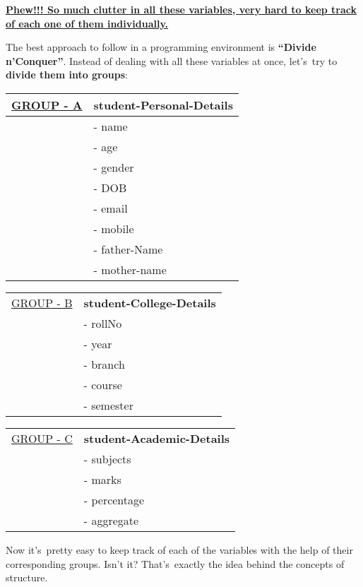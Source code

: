 \documentclass[11pt]{article}
\begin{document}
\uline{\textbf{Phew!!! So much clutter in all these variables, very hard to keep track of each
one of them individually.}}

The best approach to follow in a programming environment is \textbf{“Divide
n’Conquer”}. Instead of dealing with all these variables at once, let’s try to
\textbf{divide them into groups}:

\begin{center}
\begin{tabular}{ll}
\hline
\uline{GROUP - A} & \textbf{student-Personal-Details}\\
\hline
 & - name\\
 & - age\\
 & - gender\\
 & - DOB\\
 & - email\\
 & - mobile\\
 & - father-Name\\
 & - mother-name\\
\hline
\end{tabular}
\end{center}

\begin{center}
\begin{tabular}{ll}
\hline
\uline{GROUP - B} & \textbf{student-College-Details}\\
 & - rollNo\\
 & - year\\
 & - branch\\
 & - course\\
 & - semester\\
\hline
\end{tabular}
\end{center}

\begin{center}
\begin{tabular}{ll}
\hline
\uline{GROUP - C} & \textbf{student-Academic-Details}\\
 & - subjects\\
 & - marks\\
 & - percentage\\
 & - aggregate\\
\hline
\end{tabular}
\end{center}

Now it’s pretty easy to keep track of each of the variables with the help of their
corresponding groups. Isn’t it? That’s exactly the idea behind the concepts of structure.
\end{document}
